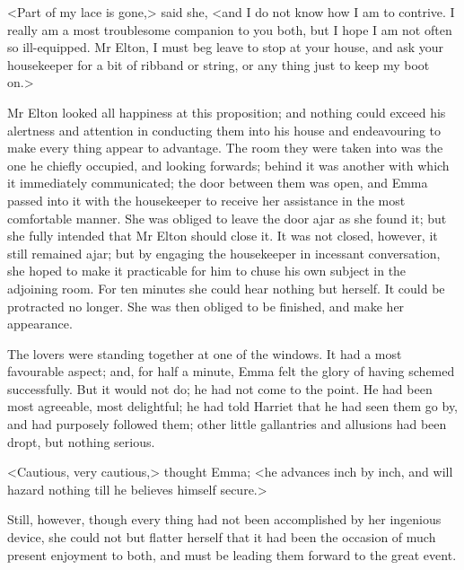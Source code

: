 <Part of my lace is gone,> said she, <and I do not know how I am to contrive. I really am a most troublesome companion to you both, but I hope I am not often so ill-equipped. Mr Elton, I must beg leave to stop at your house, and ask your housekeeper for a bit of ribband or string, or any thing just to keep my boot on.>

Mr Elton looked all happiness at this proposition; and nothing could exceed his alertness and attention in conducting them into his house and endeavouring to make every thing appear to advantage. The room they were taken into was the one he chiefly occupied, and looking forwards; behind it was another with which it immediately communicated; the door between them was open, and Emma passed into it with the housekeeper to receive her assistance in the most comfortable manner. She was obliged to leave the door ajar as she found it; but she fully intended that Mr Elton should close it. It was not closed, however, it still remained ajar; but by engaging the housekeeper in incessant conversation, she hoped to make it practicable for him to chuse his own subject in the adjoining room. For ten minutes she could hear nothing but herself. It could be protracted no longer. She was then obliged to be finished, and make her appearance.

The lovers were standing together at one of the windows. It had a most favourable aspect; and, for half a minute, Emma felt the glory of having schemed successfully. But it would not do; he had not come to the point. He had been most agreeable, most delightful; he had told Harriet that he had seen them go by, and had purposely followed them; other little gallantries and allusions had been dropt, but nothing serious.

<Cautious, very cautious,> thought Emma; <he advances inch by inch, and will hazard nothing till he believes himself secure.>

Still, however, though every thing had not been accomplished by her ingenious device, she could not but flatter herself that it had been the occasion of much present enjoyment to both, and must be leading them forward to the great event.